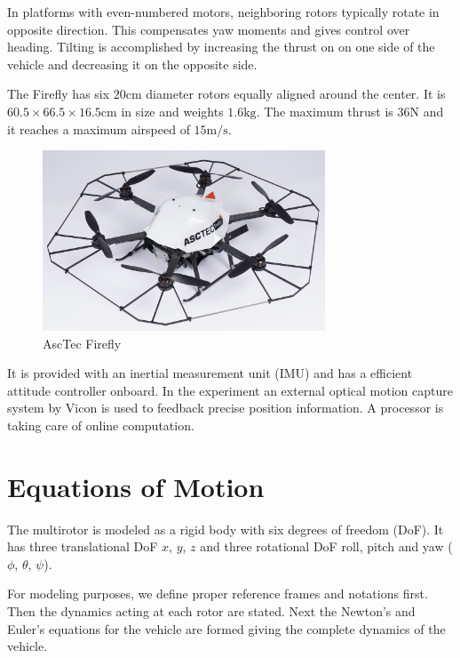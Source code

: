 In platforms with even-numbered motors, neighboring rotors typically rotate in opposite direction. This compensates yaw moments and gives control over heading. Tilting is accomplished by increasing the thrust on on one side of the vehicle and decreasing it on the opposite side.

The Firefly has six $20 \si{\cm}$ diameter rotors equally aligned around the center. It is $60.5 \times 66.5 \times 16.5 \si{\cm}$ in size and weights $1.6 \si{\kg}$. The maximum thrust is $36 \si{\N}$ and it reaches a maximum airspeed of $15 \si{\metre\per\second}$.

\begin{figure}
   \centering
   \includegraphics[width=0.75\textwidth]{images/firefly.jpg}
   \caption{AscTec Firefly \cite{www:asctec}}
   \label{pics:firefly}
\end{figure}

It is provided with an inertial measurement unit (IMU) and has a efficient attitude controller onboard. In the experiment an external optical motion capture system by Vicon is used to feedback precise position information. A processor is taking care of online computation.

\section{Equations of Motion}
\label{sec:eq_of_motion}
The multirotor is modeled as a rigid body with six degrees of freedom (DoF). It has three translational DoF $x$, $y$, $z$ and three rotational DoF roll, pitch and yaw ($\phi$, $\theta$, $\psi$).

 For modeling purposes, we define proper reference frames and notations first. Then the dynamics acting at each rotor are stated. Next the Newton's and Euler's equations for the vehicle are formed giving the complete dynamics of the vehicle.

